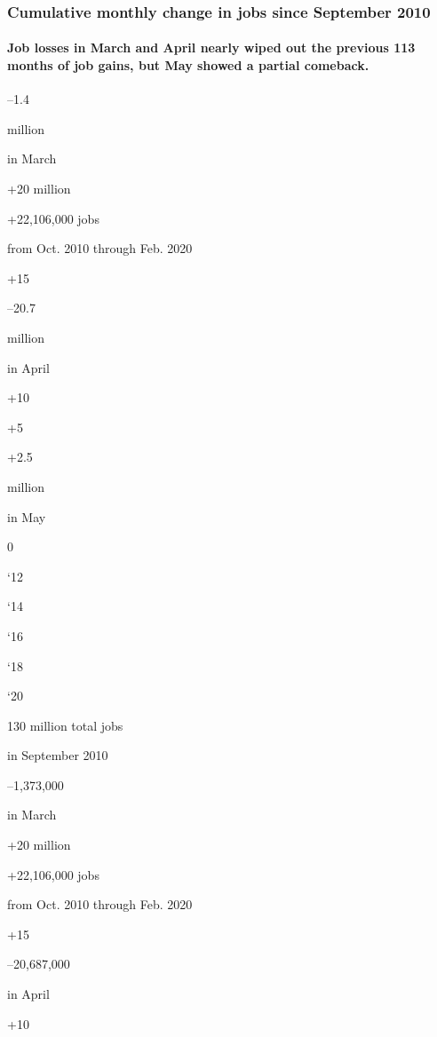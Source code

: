 \hypertarget{cumulative-monthly-change-in-jobs-since-september-2010}{%
\subsubsection{Cumulative monthly change in jobs since September
2010}\label{cumulative-monthly-change-in-jobs-since-september-2010}}

\hypertarget{job-losses-in-march-and-april-nearly-wiped-out-the-previous-113-months-of-job-gains-but-may-showed-a-partial-comeback}{%
\paragraph{Job losses in March and April nearly wiped out the previous
113 months of job gains, but May showed a partial
comeback.}\label{job-losses-in-march-and-april-nearly-wiped-out-the-previous-113-months-of-job-gains-but-may-showed-a-partial-comeback}}

--1.4

million

in March

+20 million

+22,106,000 jobs

from Oct. 2010 through Feb. 2020

+15

--20.7

million

in April

+10

+5

+2.5

million

in May

0

`12

`14

`16

`18

`20

130 million total jobs

in September 2010

--1,373,000

in March

+20 million

+22,106,000 jobs

from Oct. 2010 through Feb. 2020

+15

--20,687,000

in April

+10

